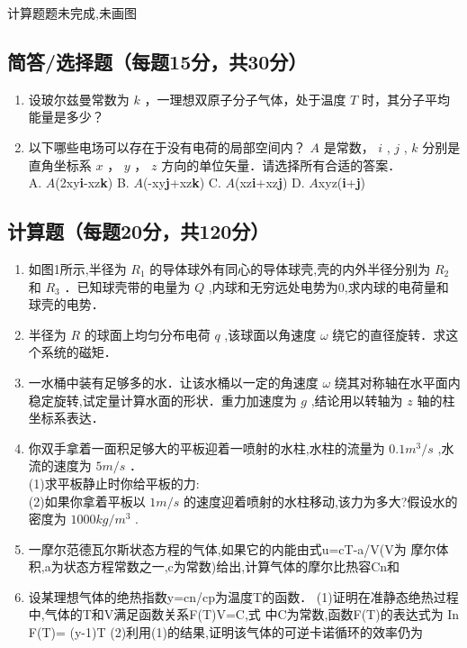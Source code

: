 
\begin{issues}
\issueTODO
计算题题未完成,未画图
\end{issues}


\subsection{简答/选择题（每题15分，共30分）}
\begin{enumerate}
\item 设玻尔兹曼常数为 $k$ ，一理想双原子分子气体，处于温度 $T$ 时，其分子平均能量是多少？
\item 以下哪些电场可以存在于没有电荷的局部空间内？ $A$ 是常数， $i$ , $j$ , $k$ 分别是直角坐标系 $x$ ， $y$ ， $z$ 方向的单位矢量．请选择所有合适的答案．\\
A. $A$(2xy\textbf{i}-xz\textbf{k}) B. $A$(-xy\textbf{j}+xz\textbf{k}) C. $A$(xz\textbf{i}+xz\textbf{j}) D. $A$xyz(\textbf{i}+\textbf{j})
\end{enumerate}
\subsection{计算题（每题20分，共120分）}
\begin{enumerate}
\item 如图1所示,半径为 $R_1$ 的导体球外有同心的导体球壳,壳的内外半径分别为 $R_2$ 和 $R_3$ ．已知球壳带的电量为 $Q$ ,内球和无穷远处电势为0,求内球的电荷量和球壳的电势．
\item 半径为 $R$ 的球面上均匀分布电荷 $q$ ,该球面以角速度 $\omega$ 绕它的直径旋转．求这个系统的磁矩．
\item 一水桶中装有足够多的水．让该水桶以一定的角速度 $\omega$ 绕其对称轴在水平面内稳定旋转,试定量计算水面的形状．重力加速度为 $g$ ,结论用以转轴为 $z$ 轴的柱坐标系表达．
\item 你双手拿着一面积足够大的平板迎着一喷射的水柱,水柱的流量为 $0.1m^{3}/s$ ,水流的速度为 $5m/s$ ．\\
(1)求平板静止时你给平板的力:\\
(2)如果你拿着平板以 $1m/s$ 的速度迎着喷射的水柱移动,该力为多大?假设水的密度为 $1000kg/m^{3}$ .
\item 一摩尔范德瓦尔斯状态方程的气体,如果它的内能由式u=cT-a/V(V为
摩尔体积,a为状态方程常数之一,c为常数)给出,计算气体的摩尔比热容Cn和
\item 设某理想气体的绝热指数y=cn/cp为温度T的函数．
(1)证明在准静态绝热过程中,气体的T和V满足函数关系F(T)V=C,式
中C为常数,函数F(T)的表达式为
In F(T)=
(y-1)T
(2)利用(1)的结果,证明该气体的可逆卡诺循环的效率仍为
\end{enumerate}